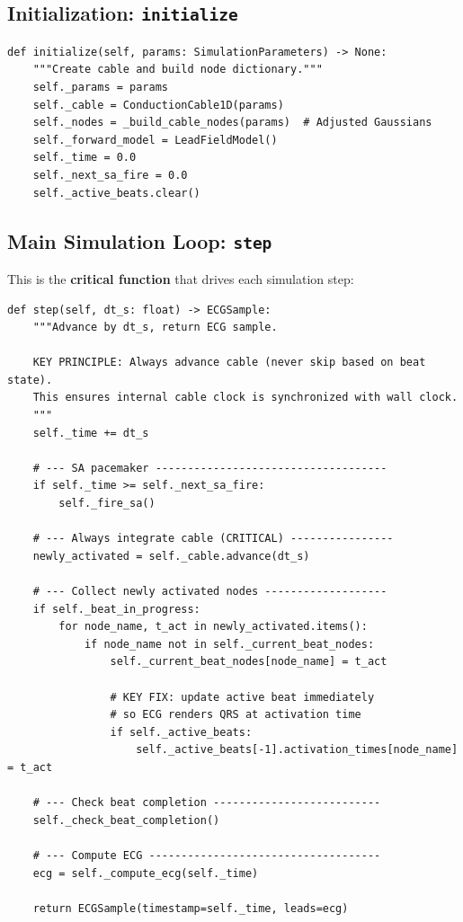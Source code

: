 \documentclass[12pt,a4paper,oneside]{book}
\begin{document}
\subsection{Initialization: \texttt{initialize}}

\begin{Verbatim}[formatcom=\color{black}]
def initialize(self, params: SimulationParameters) -> None:
    """Create cable and build node dictionary."""
    self._params = params
    self._cable = ConductionCable1D(params)
    self._nodes = _build_cable_nodes(params)  # Adjusted Gaussians
    self._forward_model = LeadFieldModel()
    self._time = 0.0
    self._next_sa_fire = 0.0
    self._active_beats.clear()
\end{Verbatim}

\subsection{Main Simulation Loop: \texttt{step}}

This is the \textbf{critical function} that drives each simulation step:

\begin{Verbatim}[formatcom=\color{black}]
def step(self, dt_s: float) -> ECGSample:
    """Advance by dt_s, return ECG sample.
    
    KEY PRINCIPLE: Always advance cable (never skip based on beat state).
    This ensures internal cable clock is synchronized with wall clock.
    """
    self._time += dt_s
    
    # --- SA pacemaker ------------------------------------
    if self._time >= self._next_sa_fire:
        self._fire_sa()
    
    # --- Always integrate cable (CRITICAL) ----------------
    newly_activated = self._cable.advance(dt_s)
    
    # --- Collect newly activated nodes -------------------
    if self._beat_in_progress:
        for node_name, t_act in newly_activated.items():
            if node_name not in self._current_beat_nodes:
                self._current_beat_nodes[node_name] = t_act
                
                # KEY FIX: update active beat immediately
                # so ECG renders QRS at activation time
                if self._active_beats:
                    self._active_beats[-1].activation_times[node_name] = t_act
    
    # --- Check beat completion --------------------------
    self._check_beat_completion()
    
    # --- Compute ECG ------------------------------------
    ecg = self._compute_ecg(self._time)
    
    return ECGSample(timestamp=self._time, leads=ecg)
\end{Verbatim}
\end{document}
